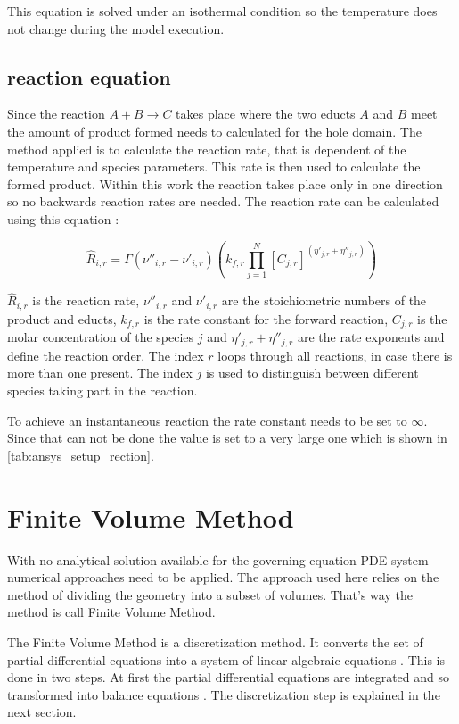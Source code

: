 \documentclass[../thesis.tex]{subfiles}
\begin{document}
This equation is solved under an isothermal condition so the temperature does not change during the model execution. 

\subsection{reaction equation}
\label{sec: reaction_eqn}

Since the reaction $ A + B \rightarrow C$ takes place where the two educts $A$ and $B$ meet the amount of product formed needs to calculated for the hole domain. The method applied is to calculate the reaction rate, that is dependent of the temperature and species parameters. This rate is then used to calculate the formed product. Within this work the reaction takes place only in one direction so no backwards reaction rates are needed. The reaction rate can be calculated using this equation \cite{manual2009ansys}:

\begin{equation}
\label{eqn:reaction}
\hat{R}_{i,r} = {\Gamma} \left(\nu''_{i,r} - \nu'_{i,r} \right) \left(k_{f,r} \prod_{j=1}^{N} \left[C_{j,r} \right]^{(\eta'_{j,r} + \eta''_{j,r})} \right) 
\end{equation}

$\hat{R}_{i,r}$ is the reaction rate, $\nu''_{i,r}$ and $\nu'_{i,r}$ are the stoichiometric numbers of the product and educts, $k_{f,r}$ is the rate constant for the forward reaction, $C_{j,r}$ is the molar concentration of the species $j$ and $\eta'_{j,r} + \eta''_{j,r}$ are the rate exponents and define the reaction order. 
The index $r$ loops through all reactions, in case there is more than one present. The index $j$ is used to distinguish between different species taking part in the reaction.

To achieve an instantaneous reaction the rate constant needs to be set to $\infty$. Since that can not be done the value is set to a very large one which is shown in \autoref{tab:ansys_setup_rection}. 

\section{Finite Volume Method}
With no analytical solution available for the governing equation PDE system numerical approaches need to be applied. The approach used here relies on the method of dividing the geometry into a subset of volumes. That's way the method is call Finite Volume Method.

The Finite Volume Method is a discretization method. It converts the set of partial differential equations into a system of linear algebraic equations \cite{darwish2021finite}. This is done in two steps. At first the partial differential equations are integrated and so transformed into balance equations \cite{darwish2021finite}. The discretization step is explained in the next section.
\end{document}
